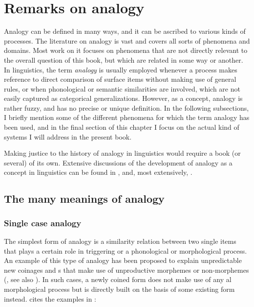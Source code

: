 \chapter{Remarks on analogy}\label{chap:problems}
\largerpage 
Analogy can be defined in many ways, and it can be ascribed to various kinds of processes. The literature on analogy is vast and covers all sorts of phenomena and domains. Most work on it focuses on phenomena that are not directly relevant to the overall question of this book, but which are related in some way or another. In linguistics, the term \textit{analogy} is usually employed whenever a process makes reference to direct comparison of surface items without making use of general rules, or when phonological or semantic similarities are involved, which are not easily captured as categorical generalizations. However, as a concept, analogy is rather fuzzy, and has no precise or unique definition. In the following subsections, I briefly mention some of the different phenomena for which the term analogy has been used, and in the final section of this chapter I focus on the actual kind of systems I will address in the present book.

Making justice to the history of analogy in linguistics would require a book (or several) of its own. Extensive discussions of the development of analogy as a concept in linguistics can be found in  \textcite{Anttila.1977}, \textcite{Rainer.2013} and, most extensively, \textcite{Itkonen.2005}.

\section{The many meanings of analogy}

\subsection{Single case analogy}

The simplest form of analogy is a similarity relation between two single items that plays a certain role in triggering or  a phonological or morphological process. An example of this type of analogy has been proposed to explain unpredictable new coinages and s that make use of unproductive morphemes or non-morphemes (\citealt[195]{Motsch.1977}, see also \citealt{Butterworth.1983}). In such cases, a newly coined form does not make use of any al morphological process but is directly built on the basis of some existing form instead. \textcite[89]{Booij.2010} cites the examples in :

